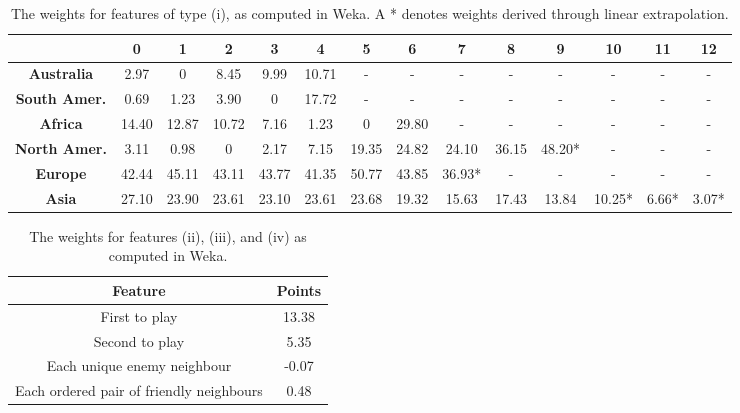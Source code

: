 \documentclass[letterpaper]{article}
\numberwithin{equation}{section}
\numberwithin{theorem}{section}
\numberwithin{lemma}{section}
\numberwithin{df}{section}
\begin{document}
\begin{table}[t]
  \begin{center} 
   \caption{The weights for features of type (i), as computed in Weka.  A * denotes weights derived through linear extrapolation.}
    \label{tab:ContScoring}
    \begin{footnotesize}
    \begin{tabular}{|c|c|c|c|c|c|c|c|c|c|c|c|c|c|}
    	\hline
    	  & \bf 0 & \bf 1 & \bf 2  & \bf 3 & \bf 4 & \bf 5 & \bf 6 & \bf 7 & \bf 8 & \bf 9 & \bf 10 & \bf 11 & \bf 12 \\
    	 \hline
    	\bf Australia & 2.97 & 0 & 8.45 & 9.99 & 10.71 & - & - & - & - & - & - & - & - \\
    	\hline
    	\bf South Amer. & 0.69 & 1.23 & 3.90 & 0 & 17.72 & - & - & - & - & - & - & - & - \\
    	\hline
    	\bf Africa & 14.40 & 12.87 & 10.72 & 7.16 & 1.23 & 0 & 29.80 & - & - & - & - & - & - \\
    	\hline
    	\bf North Amer. & 3.11 & 0.98 & 0 & 2.17 & 7.15 & 19.35 & 24.82 & 24.10 & 36.15 & 48.20* & - & - & - \\
    	\hline
    	\bf Europe & 42.44 & 45.11 & 43.11 & 43.77 & 41.35 & 50.77 & 43.85 & 36.93* & - & - & - & - & - \\
    	\hline
    	\bf Asia & 27.10 & 23.90 & 23.61 & 23.10 & 23.61 & 23.68 & 19.32 & 15.63 & 17.43 & 13.84 & 10.25* & 6.66* & 3.07* \\
    	\hline
    \end{tabular}
    \end{footnotesize}
  \end{center}
\end{table}

\begin{table}[t]
	\begin{center}
		\caption{The weights for features (ii), (iii), and (iv) as computed in Weka.} 
		\label{tab:MoreScoring}
		\begin{footnotesize}
		\begin{tabular}{|c|c|}
			\hline
			\textbf{Feature} & \textbf{Points} \\
			\hline
			First to play & 13.38 \\
			\hline
			Second to play & 5.35 \\
			\hline
			Each unique enemy neighbour & -0.07 \\
			\hline
			Each ordered pair of friendly neighbours & 0.48 \\
			\hline
		\end{tabular}
		\end{footnotesize}
	\end{center}
\end{table}
\end{document}
